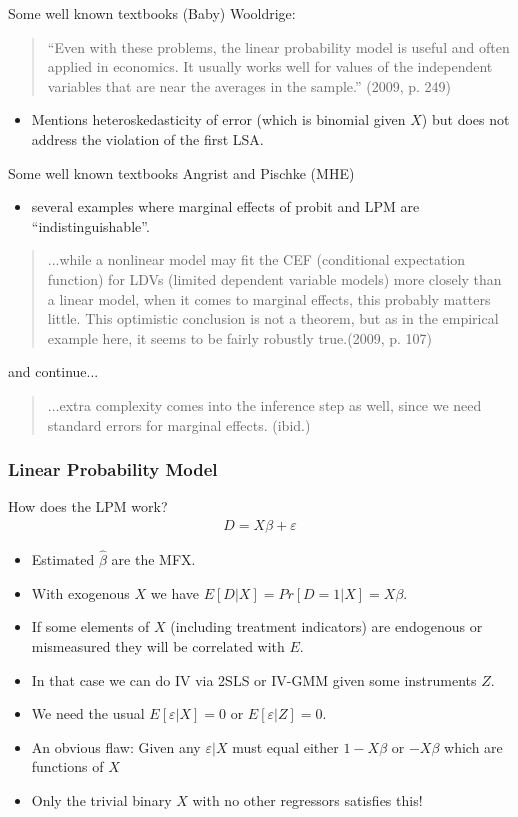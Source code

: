 \documentclass[aspectratio=169]{beamer}
\begin{document}
\begin{frame}{Some well known textbooks}
(Baby) Wooldrige:
\begin{quote}
``Even with these problems, the linear probability model is useful and often applied in economics. It usually works well for values of the independent variables that are near the averages in the sample.'' (2009, p. 249)
\end{quote}
\begin{itemize}
\item Mentions heteroskedasticity of error (which is binomial given $X$) but does not address the violation of the first LSA.
\end{itemize}
\end{frame}

\begin{frame}{Some well known textbooks}
Angrist and Pischke (MHE) 
\begin{itemize}
\item several examples where marginal effects of probit and LPM are ``indistinguishable''.
\end{itemize}

\begin{quote}
...while a nonlinear model may fit the CEF (conditional expectation function) for LDVs (limited dependent variable models) more closely than a linear model, when it comes to marginal effects, this probably matters little. This optimistic conclusion is not a theorem, but as in the empirical example here, it seems to be fairly robustly true.(2009, p. 107)
\end{quote}
and continue...
\begin{quote}
...extra complexity comes into the inference step as well, since we need standard errors for marginal effects. (ibid.)
\end{quote}
\end{frame}

\begin{frame}
\frametitle{Linear Probability Model}
How does the LPM work?
\begin{eqnarray*}
D = X \beta + \varepsilon
\end{eqnarray*}
\begin{itemize}
\item Estimated $\hat{\beta}$ are the MFX.
\item With exogenous $X$ we have $E[D | X] = Pr[D=1 | X] = X \beta$.
\item If some elements of $X$ (including treatment indicators) are endogenous or mismeasured they will be correlated with $E$.
\item In that case we can do IV via 2SLS or IV-GMM given some instruments $Z$.
\item We need the usual $E[\varepsilon  | X]= 0 $ or $E[\varepsilon | Z] = 0$. \pause
\item An obvious flaw: Given any $\varepsilon | X  $ must equal either $1- X \beta$ or $-X \beta$ which are functions of $X$
\item \alert{Only the trivial binary $X$ with no other regressors satisfies this!}
\end{itemize}
\end{frame}
\end{document}
